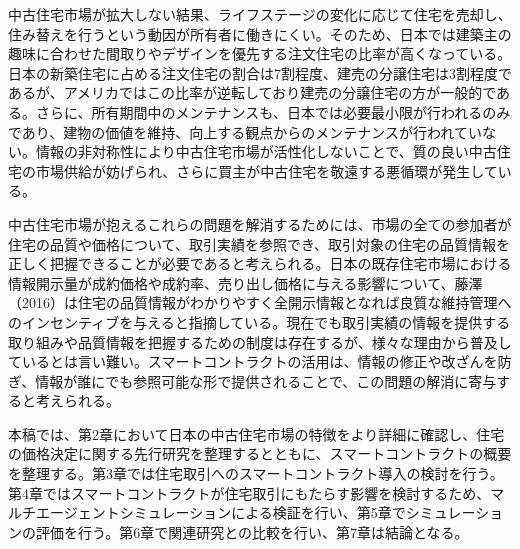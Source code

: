 \documentclass[a4paper,fontsize=11pt,report,notitlepage,line_length=38zw,number_of_lines=40,dvipdfmx]{jlreq}
\begin{document}
中古住宅市場が拡大しない結果、ライフステージの変化に応じて住宅を売却し、住み替えを行うという動因が所有者に働きにくい。そのため、日本では建築主の趣味に合わせた間取りやデザインを優先する注文住宅の比率が高くなっている。日本の新築住宅に占める注文住宅の割合は7割程度、建売の分譲住宅は3割程度であるが、アメリカではこの比率が逆転しており建売の分譲住宅の方が一般的である。さらに、所有期間中のメンテナンスも、日本では必要最小限が行われるのみであり、建物の価値を維持、向上する観点からのメンテナンスが行われていない。情報の非対称性により中古住宅市場が活性化しないことで、質の良い中古住宅の市場供給が妨げられ、さらに買主が中古住宅を敬遠する悪循環が発生している。

中古住宅市場が抱えるこれらの問題を解消するためには、市場の全ての参加者が住宅の品質や価格について、取引実績を参照でき、取引対象の住宅の品質情報を正しく把握できることが必要であると考えられる。日本の既存住宅市場における情報開示量が成約価格や成約率、売り出し価格に与える影響について、藤澤（2016）\cite{fujisawa2016}は住宅の品質情報がわかりやすく全開示情報となれば良質な維持管理へのインセンティブを与えると指摘している。現在でも取引実績の情報を提供する取り組みや品質情報を把握するための制度は存在するが、様々な理由から普及しているとは言い難い。スマートコントラクトの活用は、情報の修正や改ざんを防ぎ、情報が誰にでも参照可能な形で提供されることで、この問題の解消に寄与すると考えられる。

本稿では、第2章において日本の中古住宅市場の特徴をより詳細に確認し、住宅の価格決定に関する先行研究を整理するとともに、スマートコントラクトの概要を整理する。第3章では住宅取引へのスマートコントラクト導入の検討を行う。第4章ではスマートコントラクトが住宅取引にもたらす影響を検討するため、マルチエージェントシミュレーションによる検証を行い、第5章でシミュレーションの評価を行う。第6章で関連研究との比較を行い、第7章は結論となる。
\end{document}
